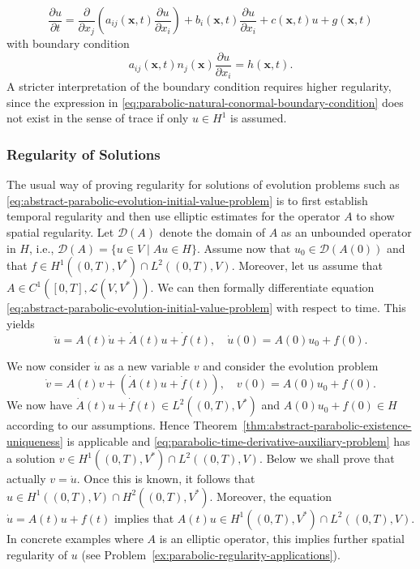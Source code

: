 \begin{Example}
\begin{equation}\label{eq:parabolic-natural-boundary-interior-equation}
\dfrac{\partial u}{\partial t}=\dfrac{\partial}{\partial x_j}\left(a_{ij}(\bm{x},t)\dfrac{\partial u}{\partial x_i}\right)+b_i(\bm{x},t)\dfrac{\partial u}{\partial x_i}+c(\bm{x},t)u+g(\bm{x},t)
\end{equation}
with boundary condition
\begin{equation}\label{eq:parabolic-natural-conormal-boundary-condition}
a_{ij}(\bm{x},t)n_j(\bm{x})\dfrac{\partial u}{\partial x_i}=h(\bm{x},t).
\end{equation}
A stricter interpretation of the boundary condition requires higher regularity, since the expression in \eqref{eq:parabolic-natural-conormal-boundary-condition} does not exist in the sense of trace if only $u\in H^1$ is assumed.
\end{Example}

\subsubsection{Regularity of Solutions}\label{subsec:parabolic-solution-regularity}

The usual way of proving regularity for solutions of evolution problems such as \eqref{eq:abstract-parabolic-evolution-initial-value-problem} is to first establish temporal regularity and then use elliptic estimates for the operator $A$ to show spatial regularity. Let $\mathcal{D}(A)$ denote the domain of $A$ as an unbounded operator in $H$, i.e., $\mathcal{D}(A)=\{u\in V\mid Au\in H\}$. Assume now that $u_0\in\mathcal{D}(A(0))$ and that $f\in H^1((0,T),V^*)\cap L^2((0,T),V)$. Moreover, let us assume that $A\in C^1([0,T],\mathcal{L}(V,V^*))$. We can then formally differentiate equation \eqref{eq:abstract-parabolic-evolution-initial-value-problem} with respect to time. This yields
\begin{equation}\label{eq:parabolic-formally-differentiated-evolution-problem}
\ddot u=A(t)\dot u+\dot A(t)u+\dot f(t),\quad\dot u(0)=A(0)u_0+f(0).
\end{equation}


We now consider $\dot u$ as a new variable $v$ and consider the evolution problem
\begin{equation}\label{eq:parabolic-time-derivative-auxiliary-problem}
\dot v=A(t)v+(\dot A(t)u+\dot f(t)),\quad v(0)=A(0)u_0+f(0).
\end{equation}
We now have $\dot A(t)u+\dot f(t)\in L^2((0,T),V^*)$ and $A(0)u_0+f(0)\in H$ according to our assumptions. Hence Theorem~\ref{thm:abstract-parabolic-existence-uniqueness} is applicable and \eqref{eq:parabolic-time-derivative-auxiliary-problem} has a solution $v\in H^1((0,T),V^*)\cap L^2((0,T),V)$. Below we shall prove that actually $v=\dot u$. Once this is known, it follows that $u\in H^1((0,T),V)\cap H^2((0,T),V^*)$. Moreover, the equation $\dot u=A(t)u+f(t)$ implies that $A(t)u\in H^1((0,T),V^*)\cap L^2((0,T),V)$. In concrete examples where $A$ is an elliptic operator, this implies further spatial regularity of $u$ (see Problem~\ref{ex:parabolic-regularity-applications}).

